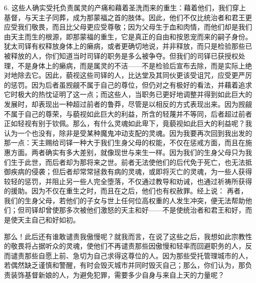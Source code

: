 6. 这些人确实受托负责属灵的产痛和藉着圣洗而来的重生：藉着他们，我们穿上基督，与天主子同葬，成为那蒙福之首的肢体。因此，他们不仅比统治者和君王更应受我们敬畏，而且比父母更应受尊敬；因为父母生于血和肉情，而他们却是我们由天主而生的根源，即那蒙福的重生，它是真正的自由和按恩宠而来的嗣子身份。犹太司铎有权释放身体上的癞病，或者更确切地说，并非释放，而只是检验那些已被释放的人，你们知道当时司铎的职务是多么被争夺。但我们的司铎已获授权处理，不是身体上的癞病，而是属灵的不洁——不是检验后宣布去除，而是实际上绝对地除去它。因此，藐视这些司铎的人，比达堂及其同伙更该受诅咒，应受更严厉的惩罚。因为后者虽觊觎不属于自己的尊位，但仍对之有极好的看法，并藉着追求它时极大的热忱证明了这一点；而这些人，当职务已更好地调整并得到如此巨大的发展时，却表现出一种超过前者的鲁莽，尽管是以相反的方式表现出来。因为觊觎不属于自己的尊荣，与藐视如此巨大的利益，所含的轻蔑并不等同，后者超过前者正如轻视有别于钦佩。那么，有什么灵魂如此卑下，竟藐视如此巨大的利益呢？我认为一个也没有，除非是受某种魔鬼冲动支配的灵魂。因为我要再次回到我出发的那一点：天主赐给司铎一种大于我们生身父母的权能，不仅在惩戒方面，而且在施惠方面。两者确实有多大差别，就像现世与来生一样。因为我们的生身父母只为我们生于此世，而后者却为那将来之世。前者无法使他们的后代免于死亡，也无法抵御疾病的侵袭；但后者却常常拯救有病的灵魂，或即将灭亡的灵魂，为一些人获得较轻的惩罚，并阻止另一些人完全堕落，不仅通过教导和劝诫，也通过祈祷所获得的援助。因为不仅在重生之时，而且在之后，他们也有权赦罪。经上说： 再者，我们的生身父母，若他们的子女与世上任何位高权重的人发生冲突，便无法帮助他们；但司铎却曾使那多次被他们激怒的天主和好——不是使统治者和君王和好，而是使天主自己和好如初。\par

那么！此后还有谁敢谴责我傲慢呢？就我而言，在说了这些之后，我想如此宗教性的敬畏将占据听众的灵魂，使他们不再谴责那些因傲慢和轻率而回避职务的人，反而谴责那些自愿上前、急切为自己求得这尊位的人。因为那些受托管理城市的人，若偶然缺乏谨慎和警醒，有时会毁灭城市并同时毁灭自己；那么，你们认为，那负责装饰基督新娘的人，为避免犯罪，需要多少自身与来自上天的力量呢？\par

